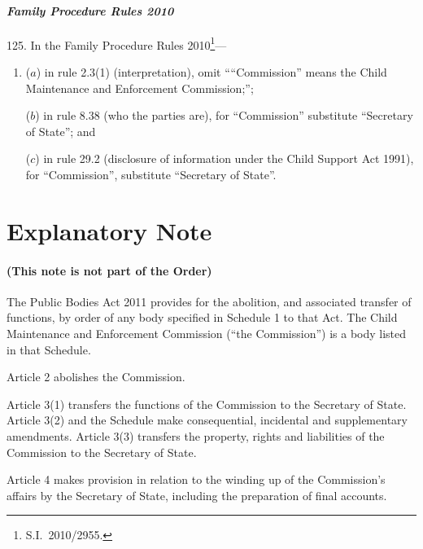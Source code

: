 \documentclass[12pt,a4paper]{article}
\begin{document}
\subsection*{\itshape
Family Procedure Rules 2010
}

125.  In the Family Procedure Rules 2010\footnote{S.I.~2010/2955.}—
\begin{enumerate}\item[]
($a$) in rule 2.3(1) (interpretation), omit ““Commission” means the Child Maintenance and Enforcement Commission;”;

($b$) in rule 8.38 (who the parties are), for “Commission” substitute “Secretary of State”; and

($c$) in rule 29.2 (disclosure of information under the Child Support Act 1991), for “Commission”, substitute “Secretary of State”. 
\end{enumerate}

\part{Explanatory Note}

\renewcommand\parthead{— Explanatory Note}

\subsection*{(This note is not part of the Order)}

The Public Bodies Act 2011 provides for the abolition, and associated transfer of functions, by order of any body specified in Schedule 1 to that Act. The Child Maintenance and Enforcement Commission (“the Commission”) is a body listed in that Schedule.

Article 2 abolishes the Commission.

Article 3(1) transfers the functions of the Commission to the Secretary of State. Article 3(2) and the Schedule make consequential, incidental and supplementary amendments. Article 3(3) transfers the property, rights and liabilities of the Commission to the Secretary of State.

Article 4 makes provision in relation to the winding up of the Commission’s affairs by the Secretary of State, including the preparation of final accounts.
\end{document}
